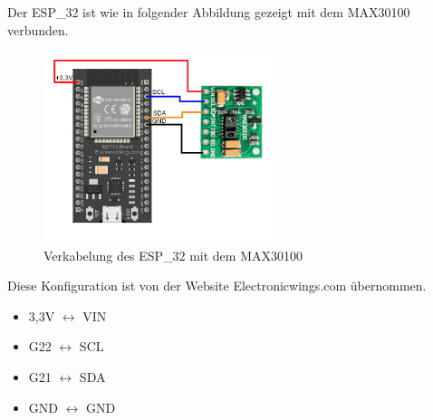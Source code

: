 \documentclass[12pt,oneside]{article}
\begin{document}
  Der ESP\_32\cite{esp32} ist wie in folgender Abbildung gezeigt mit dem MAX30100\cite{max30100breakout} verbunden. 
  \begin{figure}[tph!]
  	\begin{center}
  		\includegraphics[width=0.6\textwidth]{MAX30100 Interfacing ESP32}
	  	\caption{Verkabelung des ESP\_32 mit dem MAX30100\cite{max30100tutorial}}
	  	\label{fig:espSchaltung}
  	\end{center}
  \end{figure}
Diese Konfiguration ist von der Website Electronicwings.com übernommen.
  \begin{itemize}
  	\item 3,3V $\longleftrightarrow$ VIN
  	\item G22 $\longleftrightarrow$ SCL
  	\item G21 $\longleftrightarrow$ SDA
  	\item GND $\longleftrightarrow$ GND
  \end{itemize}
  
  
\end{document}
